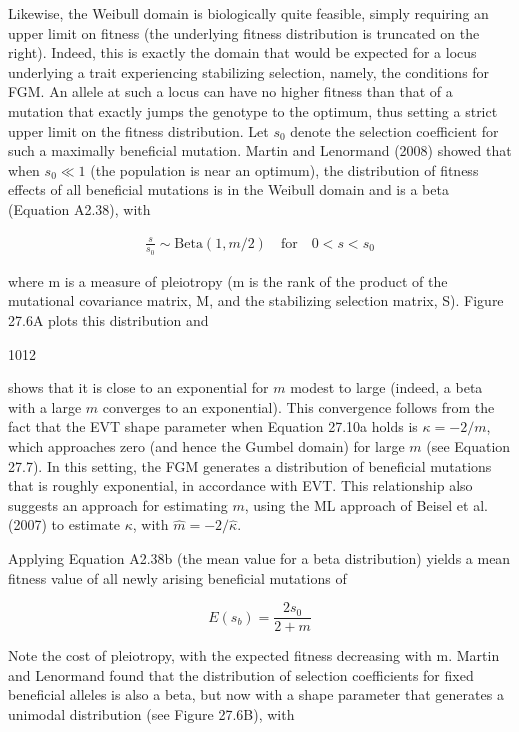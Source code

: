 \documentclass{article}
\begin{document}
Likewise, the Weibull domain is biologically quite feasible, simply requiring an upper limit on fitness (the underlying fitness distribution is truncated on the right). Indeed, this is exactly the domain that would be expected for a locus underlying a trait experiencing stabilizing selection, namely, the conditions for FGM. An allele at such a locus can have no higher fitness than that of a mutation that exactly jumps the genotype to the optimum, thus setting a strict upper limit on the fitness distribution. Let  $ s_0 $ denote the selection coefficient for such a maximally beneficial mutation. Martin and Lenormand (2008) showed that when  $ s_0 \ll 1 $ (the population is near an optimum), the distribution of fitness effects of all beneficial mutations is in the Weibull domain and is a beta (Equation A2.38), with

\begin{equation}
\begin{align*}\frac{s}{s_0}\sim\mathrm{Beta}(1,m/2)\quad\mathrm{for}\quad0<s<s_0\end{align*}
\tag{27.10a}
\label{eq:27_10a}
\end{equation}

where m is a measure of pleiotropy (m is the rank of the product of the mutational covariance matrix, M, and the stabilizing selection matrix, S). Figure 27.6A plots this distribution and

1012

shows that it is close to an exponential for $m$ modest to large (indeed, a beta with a large $m$ converges to an exponential). This convergence follows from the fact that the EVT shape parameter when Equation 27.10a holds is $\kappa = -2/m$, which approaches zero (and hence the Gumbel domain) for large $m$ (see Equation 27.7). In this setting, the FGM generates a distribution of beneficial mutations that is roughly exponential, in accordance with EVT. This relationship also suggests an approach for estimating $m$, using the ML approach of Beisel et al. (2007) to estimate $\kappa$, with $\widehat{m} = -2/\widehat{\kappa}$.

Applying Equation A2.38b (the mean value for a beta distribution) yields a mean fitness value of all newly arising beneficial mutations of

\begin{equation}
E(s_{b})=\frac{2s_{0}}{2+m}
\tag{27.10b}
\label{eq:27_10b}
\end{equation}

Note the cost of pleiotropy, with the expected fitness decreasing with m. Martin and Lenormand found that the distribution of selection coefficients for fixed beneficial alleles is also a beta, but now with a shape parameter that generates a unimodal distribution (see Figure 27.6B), with
\end{document}
